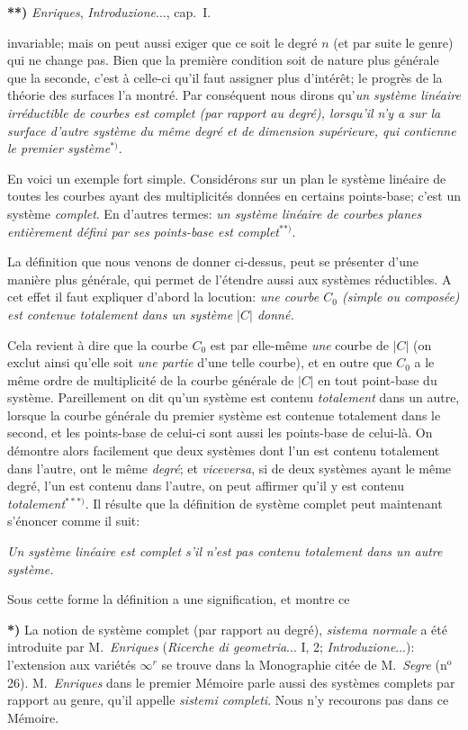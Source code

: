 \documentclass{article}
\begin{document}
\textbf{**)} \emph{Enriques}, \emph{Introduzione}..., cap.\ I.

invariable; mais on peut aussi exiger que ce soit le degré $n$ (et par suite le genre) qui ne change pas. Bien que la première condition soit de nature plus générale que la seconde, c'est à celle-ci qu'il faut assigner plus d'intérêt; le progrès de la théorie des surfaces l'a montré. Par conséquent nous dirons qu'\emph{un système linéaire irréductible de courbes est complet (par rapport au degré), lorsqu'il n'y a sur la surface d'autre système du même degré et de dimension supérieure, qui contienne le premier système}${}^{*)}$.

En voici un exemple fort simple. Considérons sur un plan le système linéaire de toutes les courbes ayant des multiplicités données en certains points-base; c'est un système \emph{complet}. En d'autres termes: \emph{un système linéaire de courbes planes entièrement défini par ses points-base est complet}${}^{**)}$.

La définition que nous venons de donner ci-dessus, peut se présenter d'une manière plus générale, qui permet de l'étendre aussi aux systèmes réductibles. A cet effet il faut expliquer d'abord la locution: \emph{une courbe $C_{0}$ (simple ou composée) est contenue totalement dans un système $|C|$ donné.}

Cela revient à dire que la courbe $C_{0}$ est par elle-même \emph{une} courbe de $|C|$ (on exclut ainsi qu'elle soit \emph{une partie} d'une telle courbe), et en outre que $C_{0}$ a le même ordre de multiplicité de la courbe générale de $|C|$ en tout point-base du système. Pareillement on dit qu'un système est contenu \emph{totalement} dans un autre, lorsque la courbe générale du premier système est contenue totalement dans le second, et les points-base de celui-ci sont aussi les points-base de celui-là. On démontre alors facilement que deux systèmes dont l'un est contenu totalement dans l'autre, ont le même \emph{degré}; et \emph{viceversa}, si de deux systèmes ayant le même degré, l'un est contenu dans l'autre, on peut affirmer qu'il y est contenu \emph{totalement}${}^{***)}$. Il résulte que la définition de système complet peut maintenant s'énoncer comme il suit:

\emph{Un système linéaire est complet s'il n'est pas contenu totalement dans un autre système.}

Sous cette forme la définition a une signification, et montre ce

\textbf{*)} La notion de système complet (par rapport au degré), \emph{sistema normale} a été introduite par M.\ \emph{Enriques} (\emph{Ricerche di geometria}... I, 2; \emph{Introduzione}...): l'extension aux variétés $\infty^{r}$ se trouve dans la Monographie citée de M.\ \emph{Segre} (n${}^{\text{o}}$ 26). M.\ \emph{Enriques} dans le premier Mémoire parle aussi des systèmes complets par rapport au genre, qu'il appelle \emph{sistemi completi}. Nous n'y recourons pas dans ce Mémoire.
\end{document}
